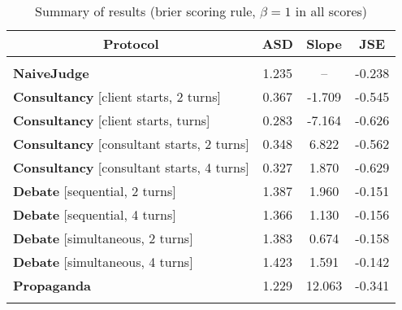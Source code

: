 \begin{table}[t]
\caption{Summary of results (brier scoring rule, $\beta=1$ in all scores)}
\label{tab:protocol-comparison}
\begin{center}
\begin{tabular}{lccc}
\multicolumn{1}{c}{\bf Protocol} & \multicolumn{1}{c}{\bf ASD} & \multicolumn{1}{c}{\bf Slope} & \multicolumn{1}{c}{\bf JSE} \\
\hline \\
\textbf{NaiveJudge} & 1.235 & -- & -0.238 \\
\textbf{Consultancy} [client starts, 2 turns] & 0.367 & -1.709 & -0.545 \\
\textbf{Consultancy} [client starts, turns] & 0.283 & -7.164 & -0.626 \\
\textbf{Consultancy} [consultant starts, 2 turns] & 0.348 & 6.822 & -0.562 \\
\textbf{Consultancy} [consultant starts, 4 turns] & 0.327 & 1.870 & -0.629 \\
\textbf{Debate} [sequential, 2 turns] & 1.387 & 1.960 & -0.151 \\
\textbf{Debate} [sequential, 4 turns] & 1.366 & 1.130 & -0.156 \\
\textbf{Debate} [simultaneous, 2 turns] & 1.383 & 0.674 & -0.158 \\
\textbf{Debate} [simultaneous, 4 turns] & 1.423 & 1.591 & -0.142 \\
\textbf{Propaganda} & 1.229 & 12.063 & -0.341 \\
\\
\end{tabular}
\end{center}
\label{tab:results}
\end{table}